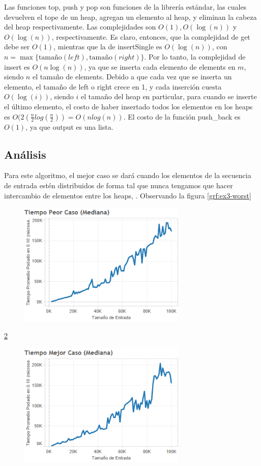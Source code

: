 \documentclass{article}
\theoremstyle{definition}
\theoremstyle{remark}
\begin{document}
Las funciones top, push y pop son funciones de la librería estándar, las cuales devuelven el tope de un heap, agregan un elemento al heap, y eliminan la cabeza del heap respectivamente. Las complejidades son $O(1), O(\log(n))$ y $O(\log(n))$, respectivamente. Es claro, entonces, que la complejidad de get debe ser $O(1)$, mientras que la de insertSingle es $O(\log(n))$, con $n = \max\{\text{tamaño}(left), \text{tamaño}(right)\}$. Por lo tanto, la complejidad de insert es $O(n \log(n))$, ya que se inserta cada elemento de elements en $m$, siendo $n$ el tamaño de elements. Debido a que cada vez que se inserta un elemento, el tamaño de left o right crece en 1, y cada inserción cuesta $O(\log(i))$, siendo $i$ el tamaño del heap en particular, para cuando se inserte el último elemento, el costo de haber insertado todos los elementos en los heaps es $O(2(\frac{n}{2} log(\frac{n}{2})) = O(nlog(n))$. El costo de la función push\_back es $O(1)$, ya que output es una lista.

\subsection{Análisis}

Para este algoritmo, el mejor caso se dará cuando los elementos de la secuencia de entrada estén distribuidos de forma tal que nunca tengamos que hacer intercambio de elementos entre los heaps, . Observando la figura \ref{grf:ex3-worst}

\begin{figure}[h!]
\centering
\label{grf:ex2-worst}
\includegraphics[width=8cm]{images/ex2-worst}
\caption{}
\end{figure}

\ref{grf:ex2-best}

\begin{figure}[h!]
\centering
\label{grf:ex2-best}
\includegraphics[width=8cm]{images/ex2-best}
\caption{}
\end{figure}
\end{document}
